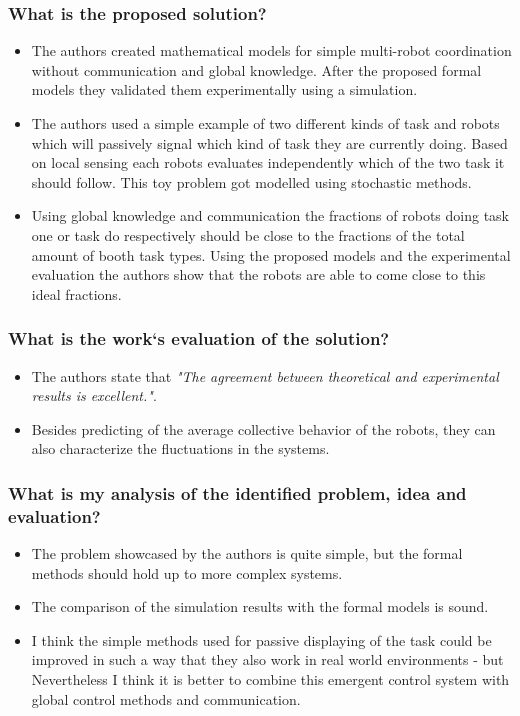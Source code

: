     \subsubsection*{What is the proposed solution?}
    \begin{itemize}
        \item The authors created mathematical models for simple multi-robot coordination without communication and global knowledge. After the proposed formal models they validated them experimentally using a simulation.
        \item The authors used a simple example of two different kinds of task and robots which will passively signal which kind of task they are currently doing. Based on local sensing each robots evaluates independently which of the two task it should follow. This toy problem got modelled using  stochastic methods.
        \item Using global knowledge and communication the fractions of robots doing task one or task do respectively should be close to the fractions of the total amount of booth task types. Using the proposed models and the experimental evaluation the authors show that the robots are able to come close to this ideal fractions.
    \end{itemize}
    \subsubsection*{What is the work`s evaluation of the solution?}
    \begin{itemize}
        \item The authors state that \emph{"The agreement between theoretical and experimental results is excellent."}. 
        \item Besides predicting of the average collective behavior of the robots, they can also characterize the fluctuations in the systems.
    \end{itemize}
    \subsubsection*{What is my analysis of the identified problem, idea and evaluation?}
    \begin{itemize}
        \item The problem showcased by the authors is quite simple, but the formal methods should hold up to more complex systems.
        \item The comparison of the simulation results with the formal models is sound. 
        \item I think the simple methods used for passive displaying of the task could be improved in such a way that they also work in real world environments - but Nevertheless I think it is better to combine this emergent control system with  global control methods and communication.
    \end{itemize}
